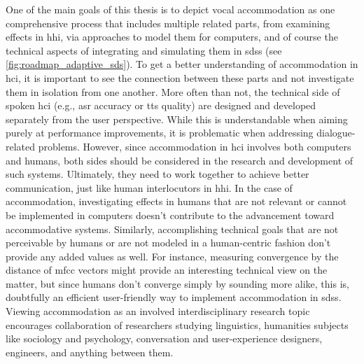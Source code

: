 










One of the main goals of this thesis is to depict vocal accommodation as one comprehensive process that includes multiple related parts, from examining effects in \ac{hhi}, via approaches to model them for computers, and of course the technical aspects of integrating and simulating them in \acp{sds} (see \cref{fig:roadmap_adaptive_sds}).
To get a better understanding of accommodation in \ac{hci}, it is important to see the connection between these parts and not investigate them in isolation from one another.
More often than not, the technical side of spoken \ac{hci} (e.g., \ac{asr} accuracy or \ac{tts} quality) are designed and developed separately from the user perspective.
While this is understandable when aiming purely at performance improvements, it is problematic when addressing dialogue-related problems.
However, since accommodation in \ac{hci} involves both computers and humans, both sides should be considered in the research and development of such systems.
Ultimately, they need to work together to achieve better communication, just like human interlocutors in \ac{hhi}.
In the case of accommodation, investigating effects in humans that are not relevant or cannot be implemented in computers doesn't contribute to the advancement toward accommodative systems.
Similarly, accomplishing technical goals that are not perceivable by humans or are not modeled in a human-centric fashion don't provide any added values as well.
For instance, measuring convergence by the distance of \ac{mfcc} vectors \citep[as done by][]{Han2018you} might provide an interesting technical view on the matter, but since humans don't converge simply by sounding more alike, this is, doubtfully an efficient user-friendly way to implement accommodation in \acp{sds}.
Viewing accommodation as an involved interdisciplinary research topic encourages collaboration of researchers studying linguistics, humanities subjects like sociology and psychology, conversation and user-experience designers, engineers, and anything between them.



